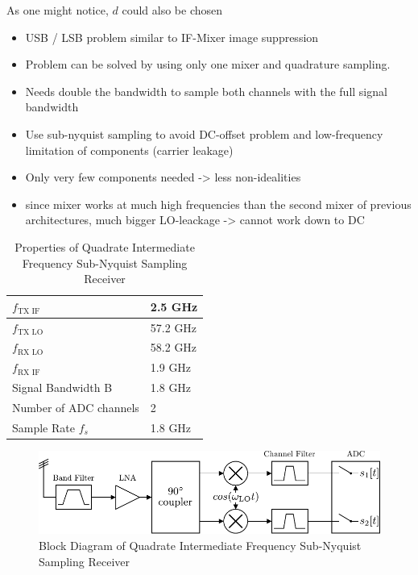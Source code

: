 As one might notice, $d$ could also be chosen



\begin{itemize}
\item USB / LSB problem similar to IF-Mixer image suppression
\item Problem can be solved by using only one mixer and quadrature sampling.
\item Needs double the bandwidth to sample both channels with the full
  signal bandwidth
\item Use sub-nyquist sampling to avoid DC-offset problem and low-frequency
  limitation of components (carrier leakage)
\item Only very few components needed -> less non-idealities
\item since mixer works at much high frequencies than the second mixer of
  previous architectures, much bigger LO-leackage -> cannot work down to DC
\end{itemize}

\begin{table}[h]
  \centering
  \begin{tabular}{|l|l|}
    \hline
    $f_{\text{TX IF}}$ & 2.5 GHz \\ \hline
    $f_{\text{TX LO}}$ & 57.2 GHz \\ \hline
    $f_{\text{RX LO}}$ & 58.2 GHz \\ \hline
    $f_{\text{RX IF}}$ & 1.9 GHz \\ \hline
    Signal Bandwidth B & 1.8 GHz \\ \hline
    Number of \gls{ADC} channels & 2 \\ \hline
    Sample Rate $f_s$ & 1.8 GHz \\ \hline
  \end{tabular}
  \caption{Properties of Quadrate Intermediate Frequency
    Sub-Nyquist Sampling Receiver}
  \label{tab:rx_2}
\end{table}

\begin{figure}[h!]
  \centering
  \includegraphics[width=\textwidth]{figures/quad_if_rx_block_diagram}
  \caption{Block Diagram of Quadrate Intermediate Frequency Sub-Nyquist Sampling Receiver}
  \label{fig:rx_2_bd}
\end{figure}

